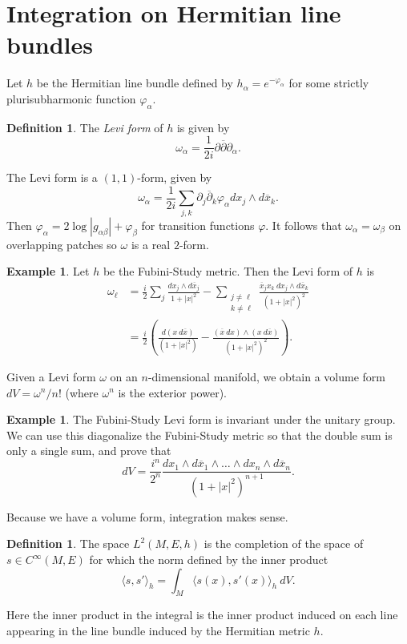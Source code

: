 \documentclass[12pt]{report}
\newcommand{\dbar}{\overline \partial}
\newcommand{\dfn}[1]{\emph{#1}\index{#1}}
\theoremstyle{definition}
\newtheorem{definition}[theorem]{Definition}
\newtheorem{example}[theorem]{Example}
\begin{document}
\section{Integration on Hermitian line bundles}
Let $h$ be the Hermitian line bundle defined by $h_\alpha = e^{-\varphi_\alpha}$ for some strictly plurisubharmonic function $\varphi_\alpha$. 
\begin{definition}
The \dfn{Levi form} of $h$ is given by
$$\omega_\alpha = \frac{1}{2i}\partial\dbar \partial_\alpha.$$
\end{definition}
The Levi form is a $(1, 1)$-form, given by
$$\omega_\alpha = \frac{1}{2i} \sum_{j,k} \partial_j\dbar_k \varphi_\alpha dx_j \wedge d\overline x_k.$$
Then
$\varphi_\alpha = 2\log|g_{\alpha\beta}| + \varphi_\beta$ for transition functions $\varphi$. It follows that $\omega_\alpha = \omega_\beta$ on overlapping patches so $\omega$ is a real $2$-form.

\begin{example}
    Let $h$ be the Fubini-Study metric. Then the Levi form of $h$ is
\begin{align*}\omega_\ell &= \frac{i}{2} \sum_j \frac{dx_j \wedge d\overline x_j}{1 + |x|^2} - \sum_{\substack{j \neq \ell\\k\neq \ell}} \frac{\overline x_j x_k ~dx_j \wedge d\overline x_k}{(1+|x|^2)^2}\\
    &= \frac{i}{2}\left(\frac{d(x~d\overline x)}{(1 + |x|^2)} - \frac{(\overline x ~dx)\wedge(x ~d\overline x)}{(1 + |x|^2)^2}\right).
\end{align*}
\end{example}

Given a Levi form $\omega$ on an $n$-dimensional manifold, we obtain a volume form $dV = \omega^n/n!$ (where $\omega^n$ is the exterior power).
\begin{example}
    The Fubini-Study Levi form is invariant under the unitary group. We can use this diagonalize the Fubini-Study metric so that the double sum is only a single sum, and prove that
    $$dV = \frac{i^n}{2^n} \frac{dx_1 \wedge d\overline x_1 \wedge \dots \wedge dx_n \wedge d\overline x_n}{(1+|x|^2)^{n+1}}.$$
\end{example}
Because we have a volume form, integration makes sense.
\begin{definition}
    The space $L^2(M, E, h)$ is the completion of the space of $s \in C^\infty(M, E)$ for which the norm defined by the inner product
    $$\langle s, s'\rangle_h = \int_M \langle s(x), s'(x)\rangle_h ~dV.$$
\end{definition}
Here the inner product in the integral is the inner product induced on each line appearing in the line bundle induced by the Hermitian metric $h$.
\end{document}

